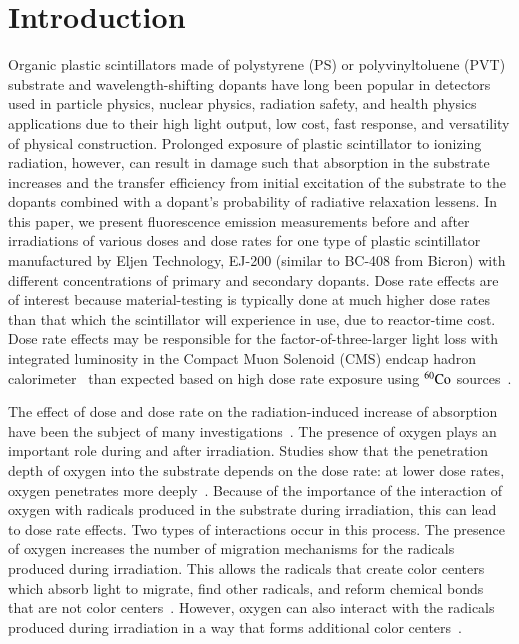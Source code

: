\documentclass[review]{elsarticle}
\begin{document}

\section{Introduction}
Organic plastic scintillators made of polystyrene (PS) or polyvinyltoluene (PVT) substrate and wavelength-shifting dopants have 
long been popular in detectors used in particle physics, nuclear physics, radiation safety, and health physics applications 
due to their high light output, low cost, fast response, and versatility of physical construction. 
Prolonged exposure of plastic scintillator to ionizing radiation, however, can result in damage such that
absorption in the substrate increases and the transfer efficiency from initial excitation of the substrate to the dopants
combined with a dopant's probability of radiative relaxation lessens. 
In this paper, we present fluorescence emission measurements before and after irradiations of various doses and 
dose rates for one type of plastic scintillator manufactured by Eljen Technology, EJ-200 (similar to BC-408 from Bicron) 
with different concentrations of primary and secondary dopants.
Dose rate effects are of interest because material-testing is typically done at much higher dose rates than 
that which the scintillator will experience in use, due to reactor-time cost.
Dose rate effects may be responsible for the factor-of-three-larger light loss with integrated luminosity 
in the Compact Muon Solenoid (CMS) endcap hadron calorimeter~\cite{phaseiitdr,ecfa2015} than expected based on high dose rate exposure 
using $\rm {^{60}Co}$ sources~\cite{vasken,ByonWagner1993263}. 

The effect of dose and dose rate on the radiation-induced increase of absorption have been the subject of many investigations~\cite{sauli}.
The presence of oxygen plays an important role during and after irradiation.
Studies show that the penetration depth of oxygen into the substrate depends on the dose rate: 
at lower dose rates, oxygen penetrates more deeply~\cite{sauli,Wick1991472,Wick2001341}. 
Because of the importance of the interaction of oxygen with radicals produced in the substrate during irradiation, 
this can lead to dose rate effects. Two types of interactions occur in this process. 
The presence of oxygen increases the number of migration mechanisms for the radicals produced during irradiation. 
This allows the radicals that create color centers which absorb light to migrate, find other radicals, 
and reform chemical bonds that are not color centers~\cite{Wulkop1995141}.
However, oxygen can also interact with the radicals produced during irradiation in a way 
that forms additional color centers~\cite{bross19921199}. 
\end{document}

